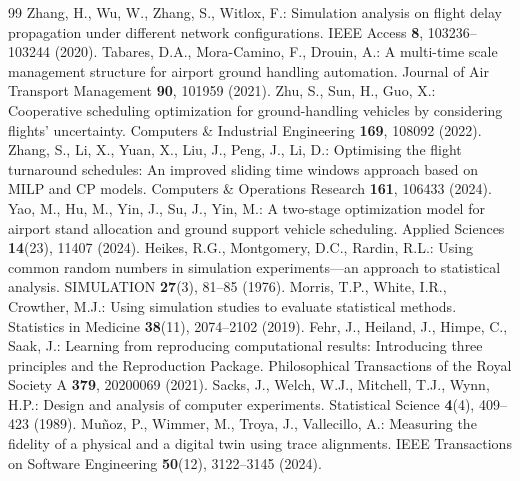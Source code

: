 \documentclass[runningheads]{llncs}
\begin{document}
\begin{thebibliography}{99}
 Zhang, H., Wu, W., Zhang, S., Witlox, F.: Simulation analysis on flight delay propagation under different network configurations. IEEE Access \textbf{8}, 103236--103244 (2020). 
 Tabares, D.A., Mora-Camino, F., Drouin, A.: A multi-time scale management structure for airport ground handling automation. Journal of Air Transport Management \textbf{90}, 101959 (2021). 
 Zhu, S., Sun, H., Guo, X.: Cooperative scheduling optimization for ground-handling vehicles by considering flights' uncertainty. Computers \& Industrial Engineering \textbf{169}, 108092 (2022). 
 Zhang, S., Li, X., Yuan, X., Liu, J., Peng, J., Li, D.: Optimising the flight turnaround schedules: An improved sliding time windows approach based on MILP and CP models. Computers \& Operations Research \textbf{161}, 106433 (2024). 
 Yao, M., Hu, M., Yin, J., Su, J., Yin, M.: A two-stage optimization model for airport stand allocation and ground support vehicle scheduling. Applied Sciences \textbf{14}(23), 11407 (2024). 
 Heikes, R.G., Montgomery, D.C., Rardin, R.L.: Using common random numbers in simulation experiments---an approach to statistical analysis. SIMULATION \textbf{27}(3), 81--85 (1976). 
 Morris, T.P., White, I.R., Crowther, M.J.: Using simulation studies to evaluate statistical methods. Statistics in Medicine \textbf{38}(11), 2074--2102 (2019). 
 Fehr, J., Heiland, J., Himpe, C., Saak, J.: Learning from reproducing computational results: Introducing three principles and the Reproduction Package. Philosophical Transactions of the Royal Society A \textbf{379}, 20200069 (2021). 
 Sacks, J., Welch, W.J., Mitchell, T.J., Wynn, H.P.: Design and analysis of computer experiments. Statistical Science \textbf{4}(4), 409--423 (1989). 
 Mu\~noz, P., Wimmer, M., Troya, J., Vallecillo, A.: Measuring the fidelity of a physical and a digital twin using trace alignments. IEEE Transactions on Software Engineering \textbf{50}(12), 3122--3145 (2024). 
\end{thebibliography}
\end{document}
